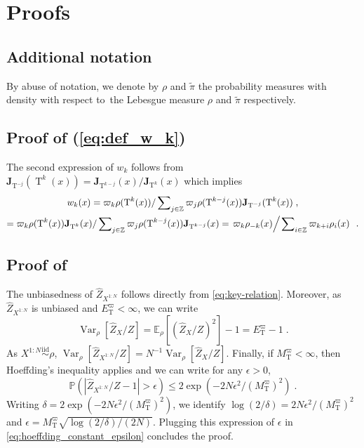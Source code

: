 \documentclass{article}
\def\simiid{\overset{\operatorname{iid}}{\sim}}
\def\transfo{\operatorname{T}}
\def\PP{\mathbb{P}}
\def\PE{\mathbb{E}}
\def\eqsp{\,}
\def\wrt{w.r.t.}
\def\eqsp{\;}
\newcommand{\1}{\mathds{1}}
\def\proposal{\rho}
\newcommand{\chunku}[3]{#1^{#2:#3}}
\def\Jac{\mathbf{J}}
\newcommand{\JacOp}[1]{\Jac_{#1}}
\def\const{Z}
\newcommand{\estConstC}[1]{\widehat{Z}_{#1}}
\def\tpi{\tilde{\pi}}
\def\zset{\mathbb{Z}}
\def\wrt{with respect to}
\def\bound{M_{\transfo}^{\varpi}}
\def\Var{\operatorname{Var}}
\begin{document}



\appendix


\section{Proofs}
\label{sec:proofs}
\subsection{Additional notation}

By abuse of notation, we denote by $\proposal$ and $\tpi$ the probability measures with density \wrt~the Lebesgue measure $\proposal$ and $\tpi$  respectively. 

\subsection{Proof of (\ref{eq:def_w_k})}
\label{app:proof:def_w_k}

The second expression of $w_k$ follows from $\JacOp{\transfo^{-j}}(\transfo^k(x)) = \JacOp{\transfo^{k-j}}(x)/\JacOp{\transfo^k}(x)$ which implies
\begin{multline}
    w_{k}(x) = 
     \varpi_k \rho(\transfo^{k}(x)) / \sum\nolimits_{j \in\zset}\varpi_j \rho(\transfo^{k-j}(x))\JacOp{\transfo^{-j}}(\transfo^k(x))\eqsp,\\
    \nonumber=  \varpi_k \rho(\transfo^{k}(x))\JacOp{\transfo^k}(x) / \sum\nolimits_{j\in\zset}\varpi_j \rho(\transfo^{k-j}(x))\JacOp{\transfo^{k-j}}(x) = \left.  \varpi_k \rho_{-k}(x) \middle / \left. \sum\nolimits_{i\in\zset}\varpi_{k+i} \rho_{i}(x) \right. \right. \eqsp.
\end{multline}

\subsection{Proof of }
\label{subsec:proof:clt_const_infine}
The unbiasedness of $\estConstC{\chunku{X}{1}{N}}$ follows directly from  \eqref{eq:key-relation}.
Moreover, as $\estConstC{\chunku{X}{1}{N}}$ is unbiased and $E^{\varpi} _{\transfo}<\infty$, we can write
\begin{equation}
    \Var_\rho[\estConstC{X}/\const] = \PE_\rho[(\estConstC{X}/\const)^2] - 1 = E^{\varpi} _{\transfo} -1\eqsp.
\end{equation}
As $\chunku{X}{1}{N}\simiid\rho$, $\Var_\rho[\estConstC{\chunku{X}{1}{N}}/\const] = N^{-1}  \Var_\rho[\estConstC{X}/\const]$. 
Finally, if $\bound < \infty$, then Hoeffding's inequality applies and we can write for any $\epsilon>0$,
\begin{equation}
\label{eq:hoeffding_constant_epsilon}
    \PP(|\estConstC{\chunku{X}{1}{N}}/\const-1|>\epsilon)\leq 2\exp( -2N\epsilon^2/(\bound)^2)\eqsp.
\end{equation}
Writing $\delta = 2\exp( -2N\epsilon^2/(\bound)^2)$, we identify
$\log(2/\delta)=2 {N\epsilon^2}/(\bound)^2$ and $\epsilon = \bound \sqrt{\log(2/\delta)/(2N)}$.
Plugging this expression of $\epsilon$ in \eqref{eq:hoeffding_constant_epsilon} concludes the proof.
\end{document}
